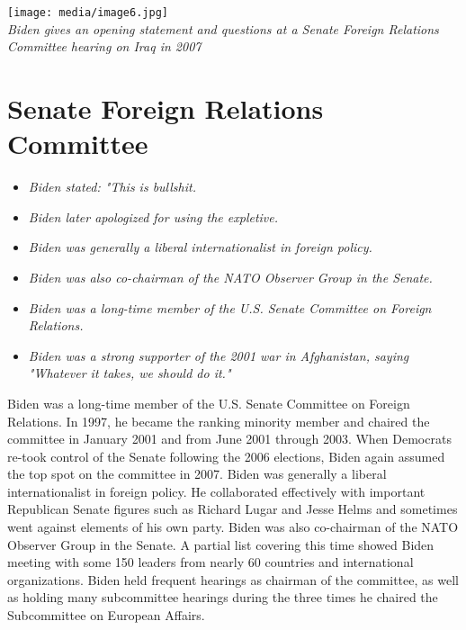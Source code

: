 \texttt{[image: media/image6.jpg]}\\
\emph{Biden gives an opening statement and questions at a Senate Foreign
Relations Committee hearing on Iraq in 2007}

\section{Senate Foreign Relations
Committee}\label{senate-foreign-relations-committee}

\begin{itemize}
\item
  \emph{Biden stated: "This is bullshit.}
\item
  \emph{Biden later apologized for using the expletive.}
\item
  \emph{Biden was generally a liberal internationalist in foreign
  policy.}
\item
  \emph{Biden was also co-chairman of the NATO Observer Group in the
  Senate.}
\item
  \emph{Biden was a long-time member of the U.S. Senate Committee on
  Foreign Relations.}
\item
  \emph{Biden was a strong supporter of the 2001 war in Afghanistan,
  saying "Whatever it takes, we should do it."}
\end{itemize}

Biden was a long-time member of the U.S. Senate Committee on Foreign
Relations. In 1997, he became the ranking minority member and chaired
the committee in January 2001 and from June 2001 through 2003. When
Democrats re-took control of the Senate following the 2006 elections,
Biden again assumed the top spot on the committee in 2007. Biden was
generally a liberal internationalist in foreign policy. He collaborated
effectively with important Republican Senate figures such as Richard
Lugar and Jesse Helms and sometimes went against elements of his own
party. Biden was also co-chairman of the NATO Observer Group in the
Senate. A partial list covering this time showed Biden meeting with some
150 leaders from nearly 60 countries and international organizations.
Biden held frequent hearings as chairman of the committee, as well as
holding many subcommittee hearings during the three times he chaired the
Subcommittee on European Affairs.

